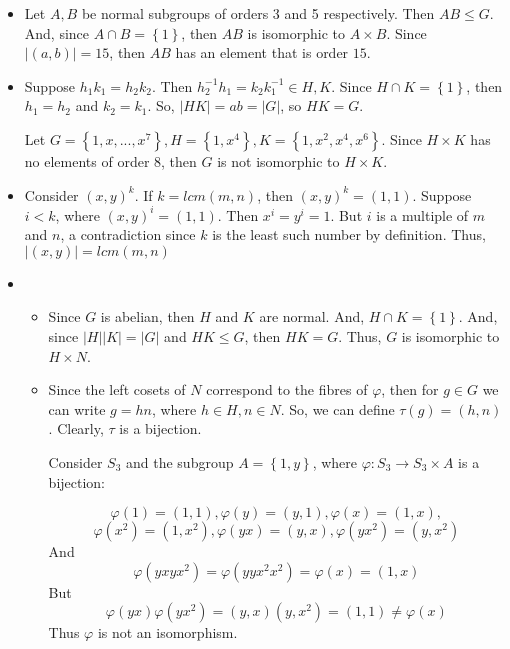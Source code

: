 \begin{itemize}
\begin{itemize}
$$\begin{bmatrix}
1 \\
& & 1 \\
& 1
\end{bmatrix}, \begin{bmatrix}
& 1 \\
& & 1 \\
1
\end{bmatrix} \right\rbrace$$
So $AB \neq BA$.
\end{itemize}
\item[(8)]
Let $A, B$ be normal subgroups of orders 3 and 5 respectively. Then $AB \leq G$. And, since $A \cap B = \left\lbrace 1 \right\rbrace$, then $AB$ is isomorphic to $A \times B$. Since $|(a, b)| = 15$, then $AB$ has an element that is order $15$.
\item[(9)]
Suppose $h_1k_1 = h_2k_2$. Then $h_2^{-1}h_1 = k_2k_1^{-1} \in H, K$. Since $H \cap K = \left\lbrace 1 \right\rbrace$, then $h_1 = h_2$ and $k_2 = k_1$. So, $|HK| = ab = |G|$, so $HK = G$.

Let $G = \left\lbrace 1, x, ..., x^7 \right\rbrace, H = \left\lbrace 1, x^4 \right\rbrace, K = \left\lbrace 1, x^2, x^4, x^6 \right\rbrace$. Since $H \times K$ has no elements of order 8, then $G$ is not isomorphic to $H \times K$.
\item[(10)]
Consider $(x, y)^k$. If $k = lcm(m ,n)$, then $(x, y)^k = (1, 1)$. Suppose $i < k$, where $(x, y)^i = (1, 1)$. Then $x^i = y^i = 1$. But $i$ is a multiple of $m$ and $n$, a contradiction since $k$ is the least such number by definition. Thus, $|(x, y)| = lcm(m, n)$
\item[(11)]
\begin{itemize}
\item[(a)]
Since $G$ is abelian, then $H$ and $K$ are normal. And, $H \cap K = \left\lbrace 1 \right\rbrace$. And, since $|H||K| = |G|$ and $HK \leq G$, then $HK = G$. Thus, $G$ is isomorphic to $H \times N$.
\item[(b)]
Since the left cosets of $N$ correspond to the fibres of $\varphi$, then for $g \in G$ we can write $g = hn$, where $h \in H, n \in N$. So, we can define $\tau(g) = (h, n)$. Clearly, $\tau$ is a bijection.

Consider $S_3$ and the subgroup $A = \left\lbrace 1, y \right\rbrace$, where $\varphi: S_3 \rightarrow S_3 \times A$ is a bijection:

$$\varphi(1) = (1, 1), \varphi(y) = (y, 1), \varphi(x) = (1, x),$$
$$\varphi(x^2) = (1, x^2), \varphi(yx) = (y, x), \varphi(yx^2) = (y, x^2)$$
And
$$\varphi(yxyx^2) = \varphi(yyx^2x^2) = \varphi(x) = (1, x)$$
But
$$\varphi(yx)\varphi(yx^2) = (y, x)(y, x^2) = (1, 1) \neq \varphi(x)$$
Thus $\varphi$ is not an isomorphism.
\end{itemize}
\end{itemize}
%
